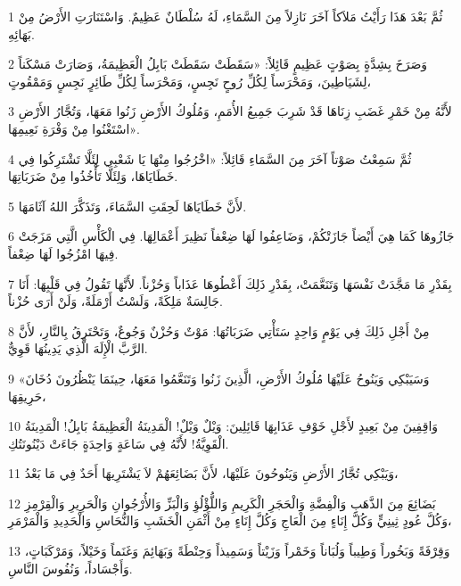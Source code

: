 \par 1 ثُمَّ بَعْدَ هَذَا رَأَيْتُ مَلاَكاً آخَرَ نَازِلاً مِنَ السَّمَاءِ، لَهُ سُلْطَانٌ عَظِيمٌ. وَاسْتَنَارَتِ الأَرْضُ مِنْ بَهَائِهِ.
\par 2 وَصَرَخَ بِشِدَّةٍ بِصَوْتٍ عَظِيمٍ قَائِلاً: «سَقَطَتْ سَقَطَتْ بَابِلُ الْعَظِيمَةُ، وَصَارَتْ مَسْكَناً لِشَيَاطِينَ، وَمَحْرَساً لِكُلِّ رُوحٍ نَجِسٍ، وَمَحْرَساً لِكُلِّ طَائِرٍ نَجِسٍ وَمَمْقُوتٍ،
\par 3 لأَنَّهُ مِنْ خَمْرِ غَضَبِ زِنَاهَا قَدْ شَرِبَ جَمِيعُ الأُمَمِ، وَمُلُوكُ الأَرْضِ زَنُوا مَعَهَا، وَتُجَّارُ الأَرْضِ اسْتَغْنُوا مِنْ وَفْرَةِ نَعِيمِهَا».
\par 4 ثُمَّ سَمِعْتُ صَوْتاً آخَرَ مِنَ السَّمَاءِ قَائِلاً: «اخْرُجُوا مِنْهَا يَا شَعْبِي لِئَلَّا تَشْتَرِكُوا فِي خَطَايَاهَا، وَلِئَلَّا تَأْخُذُوا مِنْ ضَرَبَاتِهَا.
\par 5 لأَنَّ خَطَايَاهَا لَحِقَتِ السَّمَاءَ، وَتَذَكَّرَ اللهُ آثَامَهَا.
\par 6 جَازُوهَا كَمَا هِيَ أَيْضاً جَازَتْكُمْ، وَضَاعِفُوا لَهَا ضِعْفاً نَظِيرَ أَعْمَالِهَا. فِي الْكَأْسِ الَّتِي مَزَجَتْ فِيهَا امْزُجُوا لَهَا ضِعْفاً.
\par 7 بِقَدْرِ مَا مَجَّدَتْ نَفْسَهَا وَتَنَعَّمَتْ، بِقَدْرِ ذَلِكَ أَعْطُوهَا عَذَاباً وَحُزْناً. لأَنَّهَا تَقُولُ فِي قَلْبِهَا: أَنَا جَالِسَةٌ مَلِكَةً، وَلَسْتُ أَرْمَلَةً، وَلَنْ أَرَى حُزْناً.
\par 8 مِنْ أَجْلِ ذَلِكَ فِي يَوْمٍ وَاحِدٍ سَتَأْتِي ضَرَبَاتُهَا: مَوْتٌ وَحُزْنٌ وَجُوعٌ، وَتَحْتَرِقُ بِالنَّارِ، لأَنَّ الرَّبَّ الْإِلَهَ الَّذِي يَدِينُهَا قَوِيٌّ.
\par 9 «وَسَيَبْكِي وَيَنُوحُ عَلَيْهَا مُلُوكُ الأَرْضِ، الَّذِينَ زَنُوا وَتَنَعَّمُوا مَعَهَا، حِينَمَا يَنْظُرُونَ دُخَانَ حَرِيقِهَا،
\par 10 وَاقِفِينَ مِنْ بَعِيدٍ لأَجْلِ خَوْفِ عَذَابِهَا قَائِلِينَ: وَيْلٌ وَيْلٌ! الْمَدِينَةُ الْعَظِيمَةُ بَابِلُ! الْمَدِينَةُ الْقَوِيَّةُ! لأَنَّهُ فِي سَاعَةٍ وَاحِدَةٍ جَاءَتْ دَيْنُونَتُكِ.
\par 11 وَيَبْكِي تُجَّارُ الأَرْضِ وَيَنُوحُونَ عَلَيْهَا، لأَنَّ بَضَائِعَهُمْ لاَ يَشْتَرِيهَا أَحَدٌ فِي مَا بَعْدُ،
\par 12 بَضَائِعَ مِنَ الذَّهَبِ وَالْفِضَّةِ وَالْحَجَرِ الْكَرِيمِ وَاللُّؤْلُؤِ وَالْبَزِّ وَالأُرْجُوانِ وَالْحَرِيرِ وَالْقِرْمِزِ وَكُلَّ عُودٍ ثِينِيٍّ وَكُلَّ إِنَاءٍ مِنَ الْعَاجِ وَكُلَّ إِنَاءٍ مِنْ أَثْمَنِ الْخَشَبِ وَالنُّحَاسِ وَالْحَدِيدِ وَالْمَرْمَرِ،
\par 13 وَقِرْفَةً وَبَخُوراً وَطِيباً وَلُبَاناً وَخَمْراً وَزَيْتاً وَسَمِيذاً وَحِنْطَةً وَبَهَائِمَ وَغَنَماً وَخَيْلاً، وَمَرْكَبَاتٍ، وَأَجْسَاداً، وَنُفُوسَ النَّاسِ.
